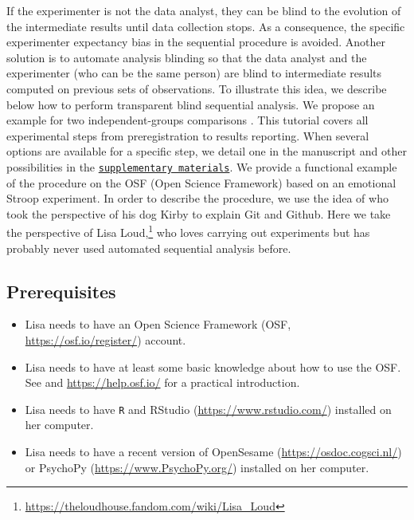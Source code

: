 \documentclass[a4paper,jou,natbib,floatsintext,donotrepeattitle]{apa6}
\begin{document}
If the experimenter is not the data analyst, they can be blind to the evolution of the intermediate results until data collection stops. As a consequence, the specific experimenter expectancy bias in the sequential procedure is avoided. Another solution is to automate analysis blinding so that the data analyst and the experimenter (who can be the same person) are blind to intermediate results computed on previous sets of observations. To illustrate this idea, we describe below how to perform transparent blind sequential analysis. We propose an example for two independent-groups comparisons \citep[as in][]{schonbrodt_sequential_2017}. This tutorial covers all experimental steps from preregistration to results reporting. When several options are available for a specific step, we detail one in the manuscript and other possibilities in the \hyperref[sec:supp]{\texttt{supplementary materials}}. We provide a functional example of the procedure on the OSF (Open Science Framework) based on an emotional Stroop experiment. In order to describe the procedure, we use the idea of \cite{rouder_what_2016} who took the perspective of his dog Kirby to explain Git and Github. Here we take the perspective of Lisa Loud,\footnote{\url{https://theloudhouse.fandom.com/wiki/Lisa\_Loud}} who loves carrying out experiments but has probably never used automated sequential analysis before.

\subsection{Prerequisites}


\begin{itemize}

\item Lisa needs to have an Open Science Framework (OSF, \url{https://osf.io/register/}) account.

\item Lisa needs to have at least some basic knowledge about how to use the OSF. See \cite{soderberg_using_2018} and \url{https://help.osf.io/} for a practical introduction.

\item Lisa needs to have \texttt{R} \citep{R-base} and RStudio (\url{https://www.rstudio.com/}) installed on her computer.

\item Lisa needs to have a recent version of OpenSesame (\url{https://osdoc.cogsci.nl/}) or PsychoPy (\url{https://www.PsychoPy.org/}) installed on her computer.

\end{itemize}
\end{document}
